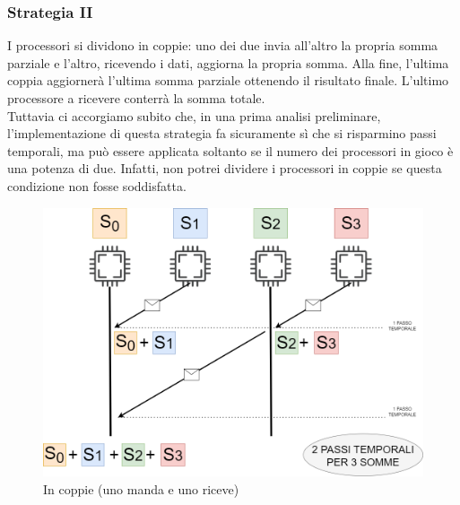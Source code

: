 \documentclass{article}
\begin{document}
\subsubsection{Strategia II}
    I processori si dividono in coppie: uno dei due invia all'altro la propria somma parziale e l'altro, ricevendo i dati, aggiorna la propria somma.
    Alla fine, l'ultima coppia aggiornerà l'ultima somma parziale ottenendo il risultato finale.
    L'ultimo processore a ricevere conterrà la somma totale.\\
    Tuttavia ci accorgiamo subito che, in una prima analisi preliminare, l'implementazione di questa strategia fa sicuramente sì che si risparmino passi temporali, ma può essere applicata soltanto se il numero dei processori in gioco è una potenza di due. Infatti, non potrei dividere i processori in coppie se questa condizione non fosse soddisfatta.
\begin{figure}
    \centering
    \includegraphics[width=1\linewidth]{strategia_II.drawio.png}
    \caption{In coppie (uno manda e uno riceve)}
    \label{fig:enter-label}
\end{figure}
\end{document}
